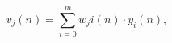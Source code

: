 \begin{equation}
v_j(n) = \sum_{i = 0}^{m}{w_ji(n) \cdot y_i(n)},
 \label{eq:inducedlocalfieldml}
\end{equation}
